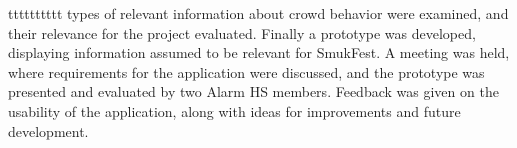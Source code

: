 tttttttttt types of relevant information about crowd behavior were examined, and their relevance for the project evaluated. Finally a prototype was developed, displaying information assumed to be relevant for SmukFest. A meeting was held, where requirements for the application were discussed, and the prototype was presented and evaluated by two Alarm HS members. Feedback was given on the usability of the application, along with ideas for improvements and future development.

